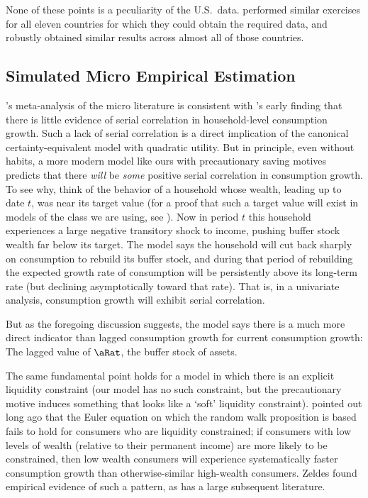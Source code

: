 \documentclass[titlepage]{\econtex}\newcommand{\texname}{cAndCwithStickyE}
\begin{document}
None of these points is a peculiarity of the U.S.\ data.  \cite{cssIntlStickyC} performed similar exercises for all eleven countries for which they could obtain the required data, and robustly obtained similar results across almost all of those countries.


\subsection{Simulated Micro Empirical Estimation} \label{subsec:simMicro}

\cite{hrsHabit}'s meta-analysis of the micro literature is consistent with \cite{dynanHabits}'s early finding that there is little evidence of serial correlation in household-level consumption growth.  Such a lack of serial correlation is a direct implication of the canonical \cite{hallRandomWalk} certainty-equivalent model with quadratic utility.  But in principle, even without habits, a more modern model like ours with precautionary saving motives predicts that there {\it will} be {\it some} positive serial correlation in consumption growth.  To see why, think of the behavior of a household whose wealth, leading up to date $t$, was near its target value (for a proof that such a target value will exist in models of the class we are using, see \cite{BufferStockTheory}).  Now in period $t$ this household experiences a large negative transitory shock to income, pushing buffer stock wealth far below its target.  The model says the household will cut back sharply on consumption to rebuild its buffer stock, and during that period of rebuilding the expected growth rate of consumption will be persistently above its long-term rate (but declining asymptotically toward that rate).  That is, in a univariate analysis, consumption growth will exhibit serial correlation.

But as the foregoing discussion suggests, the model says there is a much more direct indicator than lagged consumption growth for current consumption growth:  The lagged value of $\aRat$, the buffer stock of assets.

The same fundamental point holds for a model in which there is an explicit liquidity constraint (our model has no such constraint, but the precautionary motive induces something that looks like a `soft' liquidity constraint).  \cite{zeldes:jpe} pointed out long ago that the Euler equation on which the random walk proposition is based fails to hold for consumers who are liquidity constrained; if consumers with low levels of wealth (relative to their permanent income) are more likely to be constrained, then low wealth consumers will experience systematically faster consumption growth than otherwise-similar high-wealth consumers.  Zeldes found empirical evidence of such a pattern, as has a large subsequent literature.
\end{document}
